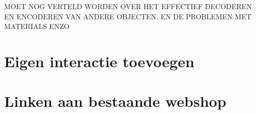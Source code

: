 MOET NOG VERTELD WORDEN OVER HET EFFECTIEF DECODEREN EN ENCODEREN VAN ANDERE OBJECTEN. EN DE PROBLEMEN MET MATERIALS ENZO

\section{Eigen interactie toevoegen}
\label{sec:eigen-interactie-toevoegen}

\section{Linken aan bestaande webshop}
\label{sec:linken-aan-bestaande-webshop}



